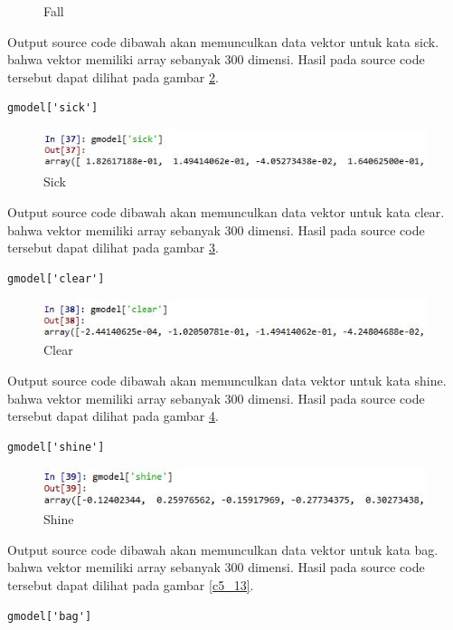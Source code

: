 \begin{enumerate}
\begin{figure}[ht]
	\caption{Fall}
	\label{c5_9}
\end{figure}
\subitem Output source code dibawah akan memunculkan data vektor untuk kata sick. bahwa vektor memiliki array sebanyak 300 dimensi. Hasil pada source code tersebut dapat dilihat pada gambar \ref{c5_10}.
\begin{verbatim}
gmodel['sick']
\end{verbatim}
\begin{figure}[ht]
	\centerline{\includegraphics[width=1\textwidth]{figures/huda/chapter5/10.JPG}}
	\caption{Sick}
	\label{c5_10}
\end{figure}
\subitem Output source code dibawah akan memunculkan data vektor untuk kata clear. bahwa vektor memiliki array sebanyak 300 dimensi. Hasil pada source code tersebut dapat dilihat pada gambar \ref{c5_11}.
\begin{verbatim}
gmodel['clear']
\end{verbatim}
\begin{figure}[ht]
	\centerline{\includegraphics[width=1\textwidth]{figures/huda/chapter5/11.JPG}}
	\caption{Clear}
	\label{c5_11}
\end{figure}
\subitem Output source code dibawah akan memunculkan data vektor untuk kata shine. bahwa vektor memiliki array sebanyak 300 dimensi. Hasil pada source code tersebut dapat dilihat pada gambar \ref{c5_12}.
\begin{verbatim}
gmodel['shine']
\end{verbatim}
\begin{figure}[ht]
	\centerline{\includegraphics[width=1\textwidth]{figures/huda/chapter5/12.JPG}}
	\caption{Shine}
	\label{c5_12}
\end{figure}
\subitem Output source code dibawah akan memunculkan data vektor untuk kata bag. bahwa vektor memiliki array sebanyak 300 dimensi. Hasil pada source code tersebut dapat dilihat pada gambar \ref{c5_13}.
\begin{verbatim}
gmodel['bag']

\end{verbatim}
\end{enumerate}

